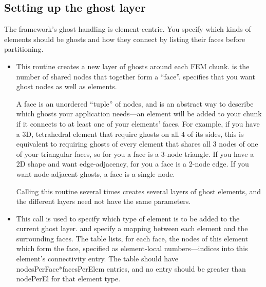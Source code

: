\subsection{Setting up the ghost layer}
The framework's ghost handling is element-centric. You specify which kinds of elements should be ghosts and how they connect by listing their faces before partitioning.  

\begin{itemize}
\item

This routine creates a new layer of ghosts around each FEM chunk.  is the number of shared nodes that together form a ``face''.  specifies that you want ghost nodes as well as elements.

A face is an unordered ``tuple'' of nodes, and is an abstract way to describe which ghosts
your application needs---an element will be added to your chunk if it connects to at 
least one of your elements' faces.  For example, if you have a 3D, tetrahedral element that require ghosts 
on all 4 of its sides, this is equivalent to requiring ghosts of every element that shares all 3
nodes of one of your triangular faces, so for you a face is a 3-node triangle.  If you have a 2D shape
and want edge-adjacency, for you a face is a 2-node edge.  If you want node-adjacent ghosts,
a face is a single node.

Calling this routine several times creates several layers of ghost elements, and the different layers need not have the same parameters.

\item
{}

This call is used to specify which type of element is to be added to the current ghost layer.  and  specify a mapping between each element and the surrounding faces.  The  table lists, for each face, the nodes of this element which form the face, specified as element-local numbers---indices into this element's connectivity entry. The  table should have nodesPerFace*facesPerElem entries, and no entry should be greater than nodePerEl for that element type.


\end{itemize}
